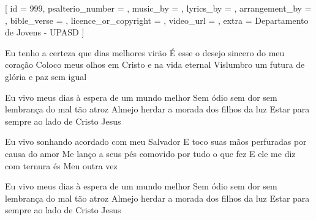 [
    id                     = {999},
    psalterio_number       = {},
    music_by               = {},
    lyrics_by              = {},
    arrangement_by         = {},
    bible_verse            = {},
    licence_or_copyright   = {},
    video_url              = {},
    extra                  = {Departamento de Jovens - UPASD}
]


\beginverse
Eu tenho a certeza que dias melhores virão
É esse o desejo sincero do meu coração
Coloco meus olhos em Cristo e na vida eternal
Vislumbro um futura de glória e paz sem igual
\endverse


\beginchorus
Eu vivo meus dias à espera de um mundo melhor
Sem ódio sem dor sem lembrança do mal tão atroz
Almejo herdar a morada dos filhos da luz
Estar para sempre ao lado de Cristo Jesus
\endchorus




\beginverse
Eu vivo sonhando acordado com meu Salvador
E toco suas mãos perfuradas por causa do amor
Me lanço a seus pés comovido por tudo o que fez
E ele me diz com ternura és Meu outra vez
\endverse


\beginchorus
Eu vivo meus dias à espera de um mundo melhor
Sem ódio sem dor sem lembrança do mal tão atroz
Almejo herdar a morada dos filhos da luz
Estar para sempre ao lado de Cristo Jesus
\endchorus

\endsong
